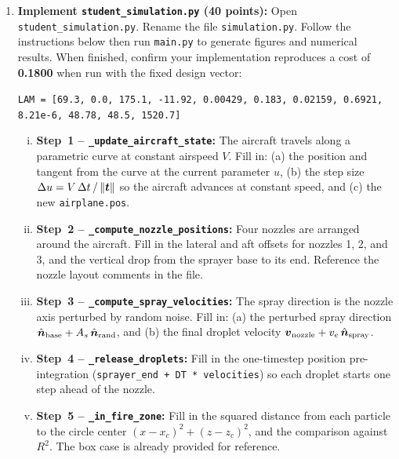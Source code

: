 \documentclass{article}
\begin{document}
\begin{enumerate}
\item[2. (b)] \textbf{Implement \texttt{student\_simulation.py} (40 points):}
Open \texttt{student\_simulation.py}. Rename the file \texttt{simulation.py}. Follow the instructions below then run \texttt{main.py} to generate figures and numerical results.
When finished, confirm your implementation reproduces a cost of \textbf{0.1800} when run with the fixed design vector:
\begin{center}
\texttt{LAM = [69.3, 0.0, 175.1, -11.92, 0.00429, 0.183, 0.02159, 0.6921, 8.21e-6, 48.78, 48.5, 1520.7]}
\end{center}

\begin{enumerate}[(i)]
    \item \textbf{Step~1 -- \texttt{\_update\_aircraft\_state}:}
          The aircraft travels along a parametric curve at constant airspeed $V$.
          Fill in: (a) the position and tangent from the curve at the current parameter $u$,
          (b) the step size $\Delta u = V\,\Delta t\,/\,\|\mbox{\boldmath $t$}\|$ so the aircraft advances at constant speed, and
          (c) the new \texttt{airplane.pos}.

    \item \textbf{Step~2 -- \texttt{\_compute\_nozzle\_positions}:}
          Four nozzles are arranged around the aircraft.
          Fill in the lateral and aft offsets for nozzles 1, 2, and 3, and the
          vertical drop from the sprayer base to its end.
          Reference the nozzle layout comments in the file.

    \item \textbf{Step~3 -- \texttt{\_compute\_spray\_velocities}:}
          The spray direction is the nozzle axis perturbed by random noise.
          Fill in: (a) the perturbed spray direction
          $\hat{\mbox{\boldmath $n$}}_\text{base} + A_s\,\hat{\mbox{\boldmath $n$}}_\text{rand}$, and
          (b) the final droplet velocity $\mbox{\boldmath $v$}_\text{nozzle} + v_e\,\hat{\mbox{\boldmath $n$}}_\text{spray}$.

    \item \textbf{Step~4 -- \texttt{\_release\_droplets}:}
          Fill in the one-timestep position pre-integration
          (\texttt{sprayer\_end + DT * velocities}) so each droplet starts
          one step ahead of the nozzle.

    \item \textbf{Step~5 -- \texttt{\_in\_fire\_zone}:}
          Fill in the squared distance from each particle to the circle center
          $(x - x_c)^2 + (z - z_c)^2$, and the comparison against $R^2$.
          The box case is already provided for reference.


\end{enumerate}
\end{enumerate}
\end{document}
